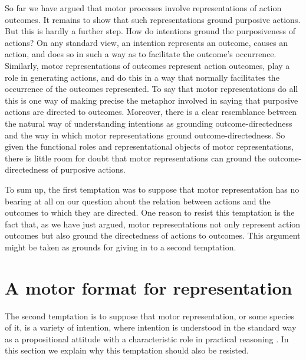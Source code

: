 \documentclass[12pt,\papersize]{extarticle}
\begin{document}
So far we have argued that motor processes involve representations of action outcomes. It remains to show that such representations ground purposive actions. But this is hardly a further step. How do intentions ground the purposiveness of actions?  On any standard view, an intention represents an outcome, causes an action, and does so in such a way as to facilitate the outcome's occurrence. Similarly, motor representations of outcomes represent action outcomes, play a role in generating actions, and do this in a way that normally facilitates the occurrence of the outcomes represented. To say that motor representations do all this is one way of making precise the metaphor involved in saying that purposive actions are directed to outcomes.  Moreover, there is a clear resemblance between the natural way of understanding intentions as grounding outcome-directedness and the way in which motor representations ground outcome-directedness.  So given the functional roles and representational objects of motor representations, there is little room for doubt that motor representations can ground the outcome-directedness of purposive actions.

To sum up, the first temptation was to suppose that motor representation has no bearing at all on our question about the relation between actions and the outcomes to which they are directed. One reason to resist this temptation is the fact that, as we have just argued, motor representations not only represent action outcomes but also ground the directedness of actions to outcomes.  This argument might be taken as grounds for giving in to a second temptation.

\section{A motor format for representation}

The second temptation is to suppose that motor representation, or some species of it, is a variety of intention, where intention is understood in the standard way as a propositional attitude with a characteristic role in practical reasoning \citep{Bratman:1987xw}. In this section we explain why this temptation should also be resisted. 
\end{document}
